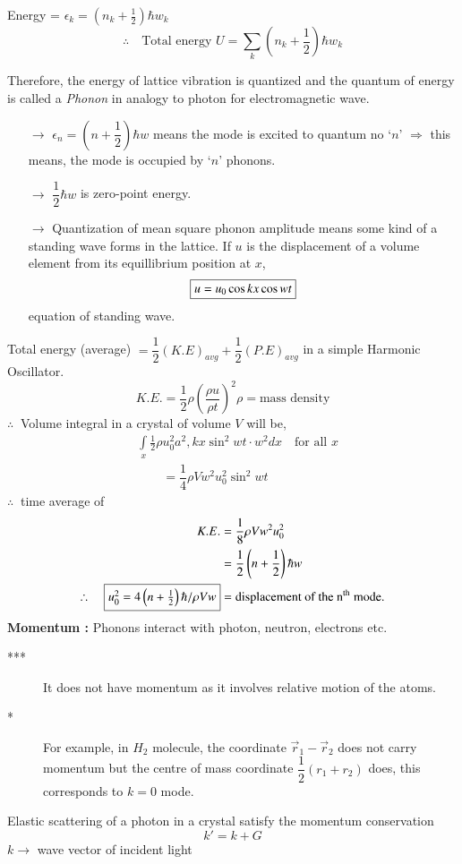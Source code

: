 Energy = $\epsilon_{k}=\left(n_{k}+\frac{1}{2}\right)\hbar w_{k}$
$$
\therefore\quad \text{Total energy } U=\sum\limits_{k}(n_{k}+\frac{1}{2})\hbar w_{k}
$$

Therefore, the energy of lattice vibration is quantized and the quantum of energy is called a {\em Phonon} in analogy to photon for electromagnetic wave.
\begin{itemize}
\item[$\to$] $\epsilon_{n}=\left(n+\dfrac{1}{2}\right)\hbar w$ means the mode is excited to quantum no `$n$' $\Rightarrow$ this means, the mode is occupied by `$n$' phonons.

\item[$\to$] $\dfrac{1}{2}\hbar w$ is zero-point energy.

\item[$\to$] Quantization of mean square phonon amplitude means some kind of a standing wave forms in the lattice. If $u$ is the displacement of a volume element from its equillibrium position at $x$,
$$
\fbox{$u=u_{0}\cos kx\cos wt$}
$$
equation of standing wave.
\end{itemize}

Total energy (average) $=\dfrac{1}{2}(K.E)_{avg}+\dfrac{1}{2}(P.E)_{avg}$ in a simple Harmonic Oscillator.
$$
K.E. = \dfrac{1}{2}\rho \left(\dfrac{\rho u}{\rho t}\right)^{2}\rho = \text{mass density}
$$
$\therefore \ $ Volume integral in a crystal of volume $V$ will be,
\begin{align*}
& \int\limits_{x}\frac{1}{2}\rho u^{2}_{0}a^{2},kx \sin^{2}wt\cdot w^{2}dx\quad \text{for all $x$}\\
&\qquad =\dfrac{1}{4}\rho Vw^{2}u^{2}_{0}\sin^{2}wt
\end{align*}
$\therefore \ $ time average of
\begin{align*}
K.E. &= \frac{1}{8}\rho Vw^{2}u^{2}_{0}\\
&= \frac{1}{2}\left(n+\frac{1}{2}\right)\hbar w\\
\therefore\quad \fbox{$u^{2}_{0}=4\left(n+\frac{1}{2}\right)\hbar/\rho Vw$} &= \text{displacement of the n$^{\text{th}}$ mode.}
\end{align*}
{\bf Momentum :} Phonons interact with photon, neutron, electrons etc.
\begin{description}
\item[{*}{*}{*}] It does not have momentum as it involves relative motion of the atoms.

\item[*] For example, in $H_{2}$ molecule, the coordinate $\overrightarrow{r}_{1}-\overrightarrow{r}_{2}$ does not carry momentum but the centre of mass coordinate $\dfrac{1}{2}(r_{1}+r_{2})$ does, this corresponds to $k=0$ mode.
\end{description}
Elastic scattering of a photon in a crystal satisfy the momentum conservation
$$
k'=k+G
$$
$k\to$ wave vector of incident light

